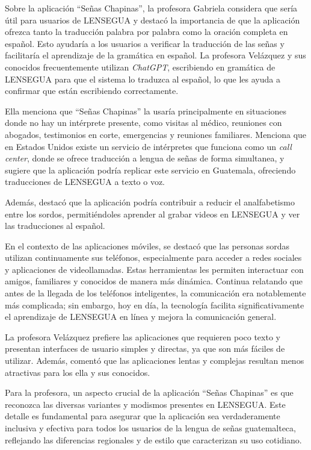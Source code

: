 Sobre la aplicación ``Señas Chapinas'', la profesora Gabriela considera que sería útil para usuarios de LENSEGUA y destacó la importancia de que la aplicación ofrezca tanto la traducción palabra por palabra como la oración completa en español. Esto ayudaría a los usuarios a verificar la traducción de las señas y facilitaría el aprendizaje de la gramática en español. La profesora Velázquez y sus conocidos frecuentemente utilizan \textit{ChatGPT}, escribiendo en gramática de LENSEGUA para que el sistema lo traduzca al español, lo que les ayuda a confirmar que están escribiendo correctamente.

Ella menciona que ``Señas Chapinas'' la usaría principalmente en situaciones donde no hay un intérprete presente, como visitas al médico, reuniones con abogados, testimonios en corte, emergencias y reuniones familiares. Menciona que en Estados Unidos existe un servicio de intérpretes que funciona como un \textit{call center}, donde se ofrece traducción a lengua de señas de forma simultanea, y sugiere que la aplicación podría replicar este servicio en Guatemala, ofreciendo traducciones de LENSEGUA a texto o voz.

Además, destacó que la aplicación podría contribuir a reducir el analfabetismo entre los sordos, permitiéndoles aprender al grabar videos en LENSEGUA y ver las traducciones al español. 

En el contexto de las aplicaciones móviles, se destacó que las personas sordas utilizan continuamente sus teléfonos, especialmente para acceder a redes sociales y aplicaciones de videollamadas. Estas herramientas les permiten interactuar con amigos, familiares y conocidos de manera más dinámica. Continua relatando que antes de la llegada de los teléfonos inteligentes, la comunicación era notablemente más complicada; sin embargo, hoy en día, la tecnología facilita significativamente el aprendizaje de LENSEGUA en línea y mejora la comunicación general. 

La profesora Velázquez prefiere las aplicaciones que requieren poco texto y presentan interfaces de usuario simples y directas, ya que son más fáciles de utilizar. Además, comentó que las aplicaciones lentas y complejas resultan menos atractivas para los ella y sus conocidos.

Para la profesora, un aspecto crucial de la aplicación ``Señas Chapinas'' es que reconozca las diversas variantes y modismos presentes en LENSEGUA. Este detalle es fundamental para asegurar que la aplicación sea verdaderamente inclusiva y efectiva para todos los usuarios de la lengua de señas guatemalteca, reflejando las diferencias regionales y de estilo que caracterizan su uso cotidiano.

